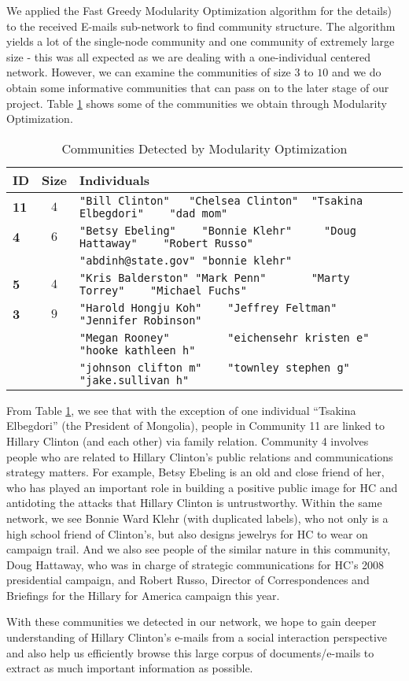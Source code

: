 We applied the Fast Greedy Modularity Optimization algorithm \cite{greedy_mod} for the details) to the received E-mails sub-network to find community structure. 
The algorithm yields a lot of the single-node community and one community of extremely large size - this was all expected as we are dealing with a one-individual centered network. 
However, we can examine the communities of size $3$ to $10$ and we do obtain some informative communities that can pass on to the later stage of our project. 
Table \ref{tab:greedy} shows some of the communities we obtain through Modularity Optimization.
\begin{table}
\centering
\begin{tabular}{|l |c| l|}\hline
{\bf ID} & \bf Size & \bf Individuals \\ \hline \hline
\bf 11 & $4$ & \verb+"Bill Clinton"   "Chelsea Clinton"  "Tsakina Elbegdori"    "dad mom"+ \\ \hline
\bf 4 & $6$ & \verb+"Betsy Ebeling"    "Bonnie Klehr"     "Doug Hattaway"    "Robert Russo"+\\
&& \verb+"abdinh@state.gov" "bonnie klehr"+\\ \hline
{\bf 5} & $4$ &\verb+"Kris Balderston" "Mark Penn"       "Marty Torrey"    "Michael Fuchs"+\\ \hline
{\bf 3} & $9$ & \verb+"Harold Hongju Koh"    "Jeffrey Feltman"      "Jennifer Robinson"+\\
&& \verb+"Megan Rooney"         "eichensehr kristen e" "hooke kathleen h"+\\
&& \verb+"johnson clifton m"    "townley stephen g"    "jake.sullivan h"+ \\
\hline 
\end{tabular}
\caption{Communities Detected by Modularity Optimization}
\label{tab:greedy}
\end{table}

From Table \ref{tab:greedy}, we see that with the exception of one individual ``Tsakina Elbegdori'' (the President of Mongolia), people in Community 11 are linked to Hillary Clinton (and each other) via family relation. 
Community 4 involves people who are related to Hillary Clinton's public relations and communications strategy matters. 
For example, Betsy Ebeling is an old and close friend of her, who has played an important role in building a positive public image for HC and antidoting the attacks that Hillary Clinton is untrustworthy. 
Within the same network, we see Bonnie Ward Klehr (with duplicated labels), who not only is a high school friend of Clinton's, but also designs jewelrys for HC to wear on campaign trail. 
And we also see people of the similar nature in this community, Doug Hattaway, who was in charge of strategic communications for HC's 2008 presidential campaign, and Robert Russo, Director of Correspondences and Briefings for the Hillary for America campaign this year. 

With these communities we detected in our network, we hope to gain deeper understanding of Hillary Clinton's e-mails from a social interaction perspective and also help us efficiently browse this large corpus of documents/e-mails to extract as much important information as possible. 
